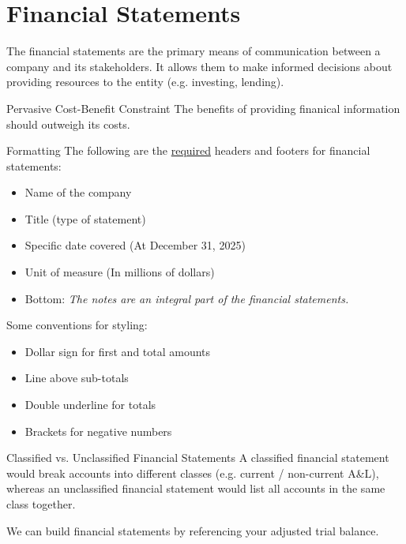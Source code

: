 \section{Financial Statements}
\label{sec:financial_statements}

The financial statements are the primary means of communication between a company and its stakeholders. It allows them to make informed decisions about providing resources to the entity (e.g. investing, lending).

\begin{knBox}
    {Pervasive Cost-Benefit Constraint}
    The benefits of providing finanical information should outweigh its costs.
\end{knBox}

\begin{knBox}
    {Formatting}
    The following are the \underline{required} headers and footers for financial statements:
    \begin{itemize}
        \item Name of the company
        \item Title (type of statement)
        \item Specific date covered (At December 31, 2025)
        \item Unit of measure (In millions of dollars)
        \item Bottom: \textit{The notes are an integral part of the financial statements.}
    \end{itemize}
    Some conventions for styling:
    \begin{itemize}
        \item Dollar sign for first and total amounts
        \item Line above sub-totals
        \item Double underline for totals
        \item Brackets for negative numbers
    \end{itemize}
\end{knBox}

\begin{theorem}
    {Classified vs. Unclassified Financial Statements}
    A classified financial statement would break accounts into different classes (e.g. current / non-current A\&L), whereas an unclassified financial statement would list all accounts in the same class together.
\end{theorem}

We can build financial statements by referencing your adjusted trial balance.

